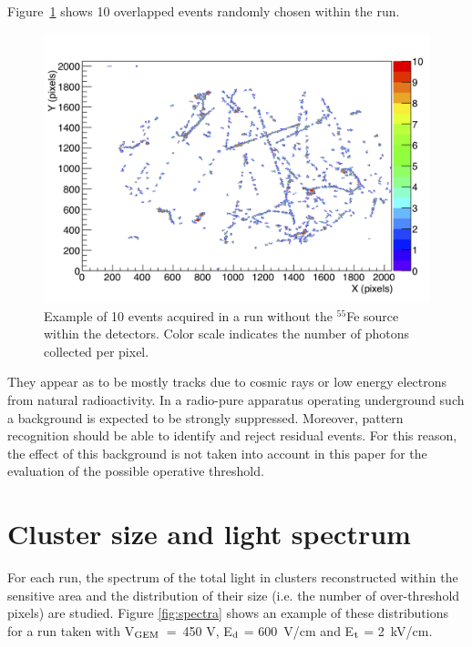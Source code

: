 \documentclass[a4paper]{jpconf}
\begin{document}
Figure~\ref{fig:bkg_evt} shows 10 overlapped events randomly chosen within the run.
%
\begin{figure}[htbp]
\centering
\includegraphics[width=.55\textwidth]{hDisplay_run121.png}
\caption{Example of 10 events acquired in a run without the $^{55}$Fe source within the detectors. Color scale indicates the number of photons collected per pixel.}
\label{fig:bkg_evt}
\end{figure}
%
They appear as to be mostly tracks due to cosmic rays or low energy
electrons from natural radioactivity.  In a radio-pure apparatus
operating underground such a background is expected to be strongly
suppressed.  Moreover, pattern recognition should be able to identify
and reject residual events. For this reason, the effect of this
background is not taken into account in this paper for the evaluation
of the possible operative threshold.


\section{Cluster size and light spectrum}

For each run, the spectrum of the total light in clusters reconstructed within the sensitive area and the distribution of their size (i.e. the number of over-threshold pixels) are studied.
Figure \ref{fig:spectra} shows an example of these distributions for a run taken with V$_{\rm GEM}$~=~450 V, E$_{\rm d}$ = 600~V/cm and E$_{\rm t}$ = 2~kV/cm.
\end{document}
